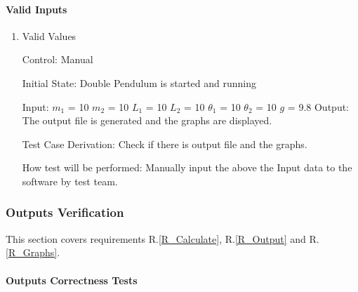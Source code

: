 \documentclass[12pt, titlepage]{article}
\begin{document}
\paragraph{Valid Inputs}

\begin{enumerate}
          
\item{Valid Values}

Control: Manual
          
Initial State: Double Pendulum is started and running
          
Input: $m_1$ = 10 $m_2$ = 10 $L_1$ = 10 $L_2$ = 10 $\theta_1$ = 10 $\theta_2$ =
10 $g$ = 9.8 Output: The output file is generated and the graphs are displayed.

Test Case Derivation: Check if there is output file and the graphs.

How test will be performed: Manually input the above the Input data to the
software by test team.

\end{enumerate}

\subsubsection{Outputs Verification}\label{VRF_Output}

This section covers requirements R.\ref{R_Calculate}, R.\ref{R_Output} and
R.\ref{R_Graphs}.

\paragraph{Outputs Correctness Tests}
\end{document}
